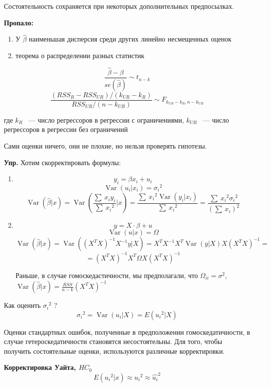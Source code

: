\documentclass[12pt]{article} %
\theoremstyle{definition} %
\DeclareMathOperator{\Var}{Var}
\begin{document}
Состоятельность сохраняется при некоторых дополнительных предпосылках.

\par

\textbf{Пропало:}
\begin{enumerate}
\item У $ \hat{\beta}  $  наименьшая дисперсия среди других линейно несмещенных оценок
\item  теорема о распределении разных статистик
\end{enumerate}
\[ \frac{ \hat{\beta} - \beta }{se(\hat\beta)} \sim  t_{n-k}  \]
\[ \frac{(RSS_R - RSS_{UR})/(k_{UR} - k_R)}{RSS_{UR}/(n-k_{UR})} \sim F_{k_{UR} - k_R
, n-k_{UR}}   \]

где $k_R$ ~---  число регрессоров в регрессии с ограничениями, $k_{UR}$ ~--- число регрессоров в регрессии без ограничений
\par

\par
Сами оценки ничего, они не плохие, но нельзя проверять гипотезы.
\par


\textbf{Упр.}
 Хотим скорректировать формулы:
\begin{enumerate}

\item
\[y_i = \beta x_i + u_i\]
\[\Var(u_i |x_i) = {\sigma_i}^2 \]
\[\Var(\hat{\beta} |x) = \Var \left (\frac{\displaystyle\sum\ {x_i y_i}}{\displaystyle\sum\ {x_i} ^2}|x \right) =\frac{\displaystyle\sum\ {x_i}^2 \Var(y_i|x_i)}{\displaystyle\sum\ {x_i} ^2} = \frac{\displaystyle\sum\ {x_i}^2 {\sigma_i}^2}{{(\displaystyle\sum\ {x_i}) ^2}}  \]
\item
\[y = X \cdot \beta + u\]
\[\Var(u|x) = \Omega  \]
\[\Var(\hat{\beta} |x) =  \Var ((X^T X)^{-1} X^{-1} y |X ) = X^T X^{-1} X^T \Var(y|X) X (X^T X)^{-1} =\] 
\[ =  (X^T X) ^{-1} X^T \Omega X (X^T X)^ {-1}\]

Раньше, в случае гомоскедастичности, мы предполагали, что $ \Omega_{ii} = {\sigma} ^2$,  
$\Var (\hat{\beta} |x) = \frac {RSS}{n-k} (X^T X)^{-1}$
\end{enumerate}
\par
Как оценить ${\sigma_i}^2$ ? 
\[{\sigma_i}^2 = \Var(u_i |X) = E({u_i}^2 |X) \]
\par
Оценки стандартных ошибок, полученные в предположении гомоскедатичности, в случае гетероскедатичности становятся несостоятельны. Для того, чтобы получить состоятельные оценки, используются  различные корректировки.
\par
\textbf{Корректировка Уайта, $HC_0$}
\[E({u_i}^2|x) \approx {u_i}^2 \approx {\hat{u_i}^2}\]
\end{document}
